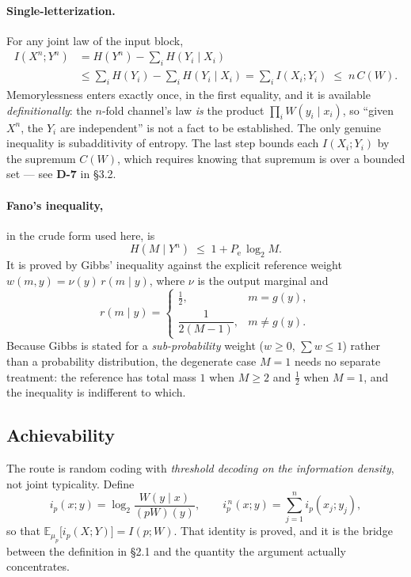 \documentclass[11pt,a4paper]{article}
\newcommand{\Pe}{P_{\mathrm{e}}}
\begin{document}
\paragraph{Single-letterization.}
For any joint law of the input block,
\[
\begin{aligned}
  I(X^{n};Y^{n})
  &= H(Y^{n}) - \sum_{i} H(Y_i\mid X_i)\\[2pt]
  &\le \sum_i H(Y_i) - \sum_i H(Y_i\mid X_i)
   = \sum_i I(X_i;Y_i)
   \;\le\; n\,C(W).
\end{aligned}
\]
Memorylessness enters exactly once, in the first equality, and it is available
\emph{definitionally}: the $n$-fold channel's law \emph{is} the product
$\prod_i W(y_i\mid x_i)$, so ``given $X^{n}$, the $Y_i$ are independent'' is not a
fact to be established. The only genuine inequality is subadditivity of entropy.
The last step bounds each $I(X_i;Y_i)$ by the supremum $C(W)$, which requires
knowing that supremum is over a bounded set --- see \textbf{D-7} in \S3.2.

\paragraph{Fano's inequality,} in the crude form used here, is
\[
  H(M\mid Y^{n}) \;\le\; 1 + \Pe\,\log_2 M .
\]
It is proved by Gibbs' inequality against the explicit reference weight
$w(m,y) = \nu(y)\,r(m\mid y)$, where $\nu$ is the output marginal and
\[
  r(m\mid y) =
  \begin{cases}
    \tfrac12, & m = g(y),\\[2pt]
    \dfrac{1}{2(M-1)}, & m \neq g(y).
  \end{cases}
\]
Because Gibbs is stated for a \emph{sub-probability} weight ($w\ge 0$,
$\sum w \le 1$) rather than a probability distribution, the degenerate case
$M=1$ needs no separate treatment: the reference has total mass $1$ when
$M\ge 2$ and $\tfrac12$ when $M=1$, and the inequality is indifferent to which.

\subsection{Achievability}

The route is random coding with \emph{threshold decoding on the information
density}, not joint typicality. Define
\[
  i_p(x;y) = \log_2\frac{W(y\mid x)}{(pW)(y)},
  \qquad
  i_p^{\,n}(x;y) = \sum_{j=1}^{n} i_p(x_j;y_j),
\]
so that $\mathbb{E}_{\mu_p}\bigl[i_p(X;Y)\bigr] = I(p;W)$. That identity is
proved, and it is the bridge between the definition in \S2.1 and the quantity the
argument actually concentrates.
\end{document}
